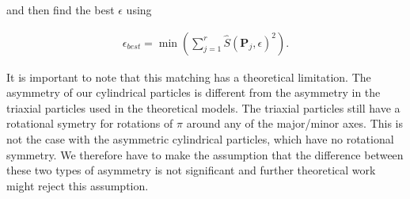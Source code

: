 and then find the best $\epsilon$ using

\begin{eqnarray}
\epsilon_{best} = \min(\sum\limits_{j=1}^{r} \hat{S}(\mathbf{P}_j, \epsilon)^2).
\end{eqnarray}


It is important to note that this matching has a theoretical limitation. The asymmetry of our cylindrical particles is different from the asymmetry in the triaxial particles used in the theoretical models. The triaxial particles still have a rotational symetry for rotations of $\pi$ around any of the major/minor axes. This is not the case with the asymmetric cylindrical particles, which have no rotational symmetry. We therefore have to make the assumption that the difference between these two types of asymmetry is not significant and further theoretical work might reject this assumption.

